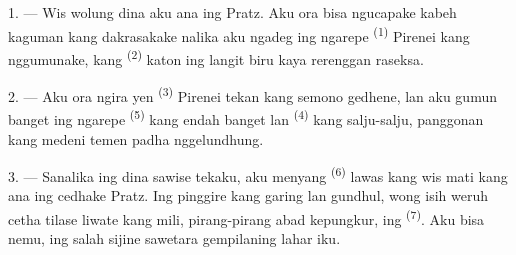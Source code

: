 %

\VUsaut{4.0mm}
\VUsaut{3.0mm}

\VUsaut{3.0mm}
\VUsaut{3.0mm}

\VUsaut{3.0mm}
\VUsaut{3.0mm}

1. --- Wis wolung dina aku ana ing Pratz. Aku ora bisa ngucapake kabeh
kaguman kang dakrasakake nalika aku ngadeg ing ngarepe
 \textsuperscript{(1)} Pirenei kang nggumunake, kang
 \textsuperscript{(2)} katon ing langit biru kaya rerenggan
raseksa.

2. --- Aku ora ngira yen  \textsuperscript{(3)} Pirenei
tekan  kang semono gedhene, lan aku gumun banget ing
ngarepe  \textsuperscript{(5)} kang endah banget lan
 \textsuperscript{(4)} kang salju-salju, panggonan
 kang medeni temen padha nggelundhung.

\VUsaut{3.0mm}
\VUsaut{3.0mm}

3. --- Sanalika ing dina sawise tekaku, aku menyang  \textsuperscript{(6)} lawas kang wis mati kang ana ing cedhake
Pratz. Ing pinggire  kang garing lan gundhul, wong isih
weruh cetha tilase liwate  kang mili, pirang-pirang abad
kepungkur, ing  \textsuperscript{(7)}. Aku
bisa nemu, ing salah sijine  sawetara
gempilaning lahar iku.

